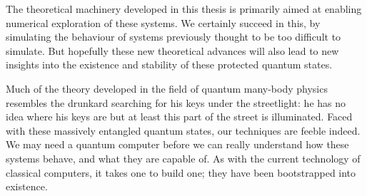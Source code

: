 \documentclass[11pt,oneside]{report}
\begin{document}
The theoretical machinery developed in this thesis is primarily 
aimed at enabling numerical exploration of these systems.
We certainly succeed in this, by simulating the behaviour of
systems previously thought to be too difficult to simulate.
But hopefully these new theoretical advances
will also lead to new insights
into the existence and stability of these protected quantum states.

Much of the theory developed in the field of quantum
many-body physics resembles the drunkard searching for his
keys under the streetlight:
he has no idea where his keys are
but at least this part of the street is illuminated.
Faced with these massively entangled quantum states,
our techniques are feeble indeed. 
We may need a quantum
computer before we can really understand how these systems
behave, and what they are capable of.
As with the current technology of classical computers,
it takes one to build one; 
they have been bootstrapped into existence.


{}

\end{document}
